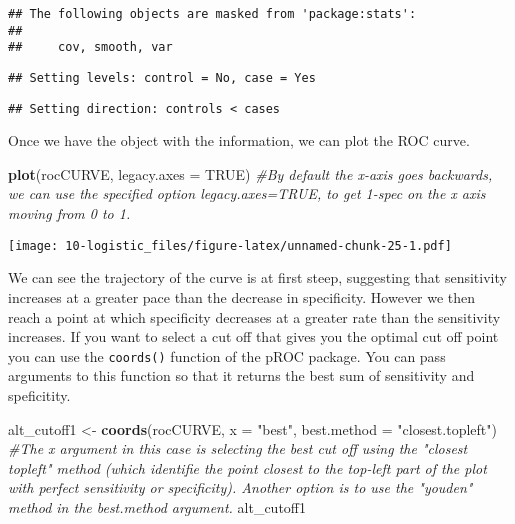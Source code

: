 \documentclass[
]{book}
\newenvironment{Shaded}{\begin{snugshade}}{\end{snugshade}}
\newcommand{\AttributeTok}[1]{\textcolor[rgb]{0.13,0.29,0.53}{#1}}
\newcommand{\CommentTok}[1]{\textcolor[rgb]{0.56,0.35,0.01}{\textit{#1}}}
\newcommand{\ConstantTok}[1]{\textcolor[rgb]{0.56,0.35,0.01}{#1}}
\newcommand{\FunctionTok}[1]{\textcolor[rgb]{0.13,0.29,0.53}{\textbf{#1}}}
\newcommand{\NormalTok}[1]{#1}
\newcommand{\OtherTok}[1]{\textcolor[rgb]{0.56,0.35,0.01}{#1}}
\newcommand{\SpecialCharTok}[1]{\textcolor[rgb]{0.81,0.36,0.00}{\textbf{#1}}}
\newcommand{\StringTok}[1]{\textcolor[rgb]{0.31,0.60,0.02}{#1}}
\begin{document}
\begin{verbatim}
## The following objects are masked from 'package:stats':
## 
##     cov, smooth, var
\end{verbatim}

\begin{Shaded}
\end{Shaded}

\begin{verbatim}
## Setting levels: control = No, case = Yes
\end{verbatim}

\begin{verbatim}
## Setting direction: controls < cases
\end{verbatim}

Once we have the object with the information, we can plot the ROC curve.

\begin{Shaded}
\begin{Highlighting}[]
\FunctionTok{plot}\NormalTok{(rocCURVE, }\AttributeTok{legacy.axes =} \ConstantTok{TRUE}\NormalTok{) }\CommentTok{\#By default the x{-}axis goes backwards, we can use the specified option legacy.axes=TRUE, to get 1{-}spec on the x axis moving from 0 to 1.}
\end{Highlighting}
\end{Shaded}

\texttt{[image: 10-logistic\_files/figure-latex/unnamed-chunk-25-1.pdf]}

We can see the trajectory of the curve is at first steep, suggesting that sensitivity increases at a greater pace than the decrease in specificity. However we then reach a point at which specificity decreases at a greater rate than the sensitivity increases. If you want to select a cut off that gives you the optimal cut off point you can use the \texttt{coords()} function of the pROC package. You can pass arguments to this function so that it returns the best sum of sensitivity and speficitity.

\begin{Shaded}
\begin{Highlighting}[]
\NormalTok{alt\_cutoff1 }\OtherTok{\textless{}{-}} \FunctionTok{coords}\NormalTok{(rocCURVE, }\AttributeTok{x =} \StringTok{"best"}\NormalTok{, }\AttributeTok{best.method =} \StringTok{"closest.topleft"}\NormalTok{)}
\CommentTok{\#The x argument in this case is selecting the best cut off using the "closest topleft" method (which identifie the point closest to the top{-}left part of the plot with perfect sensitivity or specificity). Another option is to use the "youden" method in the best.method argument.}
\NormalTok{alt\_cutoff1}
\end{Highlighting}
\end{Shaded}
\end{document}

